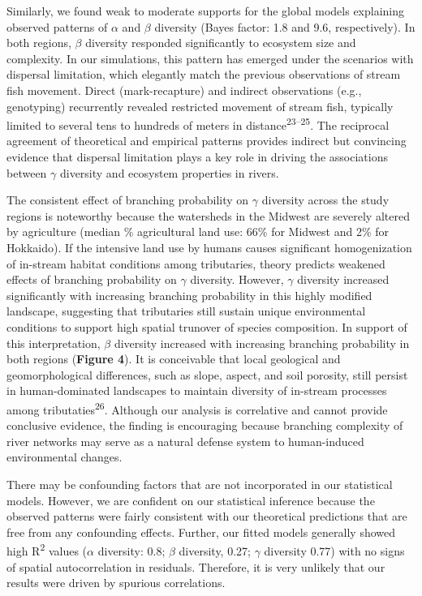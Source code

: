\documentclass[
]{article}
\begin{document}
Similarly, we found weak to moderate supports for the global models
explaining observed patterns of \(\alpha\) and \(\beta\) diversity
(Bayes factor: 1.8 and 9.6, respectively). In both regions, \(\beta\)
diversity responded significantly to ecosystem size and complexity. In
our simulations, this pattern has emerged under the scenarios with
dispersal limitation, which elegantly match the previous observations of
stream fish movement. Direct (mark-recapture) and indirect observations
(e.g., genotyping) recurrently revealed restricted movement of stream
fish, typically limited to several tens to hundreds of meters in
distance\textsuperscript{23--25}. The reciprocal agreement of
theoretical and empirical patterns provides indirect but convincing
evidence that dispersal limitation plays a key role in driving the
associations between \(\gamma\) diversity and ecosystem properties in
rivers.

The consistent effect of branching probability on \(\gamma\) diversity
across the study regions is noteworthy because the watersheds in the
Midwest are severely altered by agriculture (median \% agricultural land
use: 66\% for Midwest and 2\% for Hokkaido). If the intensive land use
by humans causes significant homogenization of in-stream habitat
conditions among tributaries, theory predicts weakened effects of
branching probability on \(\gamma\) diversity. However, \(\gamma\)
diversity increased significantly with increasing branching probability
in this highly modified landscape, suggesting that tributaries still
sustain unique environmental conditions to support high spatial trunover
of species composition. In support of this interpretation, \(\beta\)
diversity increased with increasing branching probability in both
regions (\textbf{Figure 4}). It is conceivable that local geological and
geomorphological differences, such as slope, aspect, and soil porosity,
still persist in human-dominated landscapes to maintain diversity of
in-stream processes among tributaties\textsuperscript{26}. Although our
analysis is correlative and cannot provide conclusive evidence, the
finding is encouraging because branching complexity of river networks
may serve as a natural defense system to human-induced environmental
changes.

There may be confounding factors that are not incorporated in our
statistical models. However, we are confident on our statistical
inference because the observed patterns were fairly consistent with our
theoretical predictions that are free from any confounding effects.
Further, our fitted models generally showed high R\textsuperscript{2}
values (\(\alpha\) diversity: 0.8; \(\beta\) diversity, 0.27; \(\gamma\)
diversity 0.77) with no signs of spatial autocorrelation in residuals.
Therefore, it is very unlikely that our results were driven by spurious
correlations.
\end{document}
